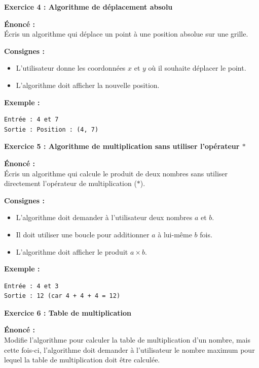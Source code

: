\documentclass{article}
\begin{document}
\begin{tcolorbox}[colback=green!10!white, colframe=yellow!75!black, title=\textcolor{white}{Exercices}]

\textbf{Exercice 4 : Algorithme de déplacement absolu}

\textbf{Énoncé :} \\
Écris un algorithme qui déplace un point à une position absolue sur une grille.

\textbf{Consignes :}
\begin{itemize}
    \item L'utilisateur donne les coordonnées \( x \) et \( y \) où il souhaite déplacer le point.
    \item L'algorithme doit afficher la nouvelle position.
\end{itemize}

\textbf{Exemple :}
\begin{verbatim}
Entrée : 4 et 7
Sortie : Position : (4, 7)
\end{verbatim}

\vspace{0.5cm}

\textbf{Exercice 5 : Algorithme de multiplication sans utiliser l'opérateur \(*\)}

\textbf{Énoncé :} \\
Écris un algorithme qui calcule le produit de deux nombres sans utiliser directement l'opérateur de multiplication (\(*\)).

\textbf{Consignes :}
\begin{itemize}
    \item L'algorithme doit demander à l'utilisateur deux nombres \( a \) et \( b \).
    \item Il doit utiliser une boucle pour additionner \( a \) à lui-même \( b \) fois.
    \item L'algorithme doit afficher le produit \( a \times b \).
\end{itemize}

\textbf{Exemple :}
\begin{verbatim}
Entrée : 4 et 3
Sortie : 12 (car 4 + 4 + 4 = 12)
\end{verbatim}

\vspace{0.5cm}

\textbf{Exercice 6 : Table de multiplication}

\textbf{Énoncé :} \\
Modifie l'algorithme pour calculer la table de multiplication d'un nombre, mais cette fois-ci, l'algorithme doit demander à l'utilisateur le nombre maximum pour lequel la table de multiplication doit être calculée.


\end{tcolorbox}
\end{document}

